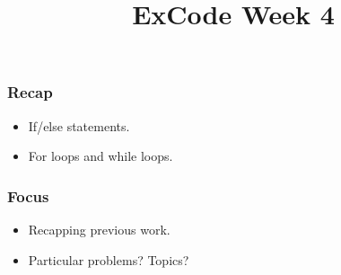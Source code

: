 \documentclass{beamer}
\title{ExCode Week 4}
\institute{University of Exeter}
\date{\displaydate{today}}
\begin{document}
\frame{\titlepage}

\begin{frame}
	\frametitle{Recap}

	\begin{itemize}
		\item{If/else statements.}
		\item{For loops and while loops.}
	\end{itemize}
\end{frame}

\begin{frame}
	\frametitle{Focus}

	\begin{itemize}
		\item{Recapping previous work.}
		\item{Particular problems? Topics?}
	\end{itemize}
\end{frame}
\end{document}
